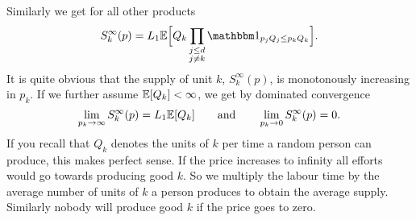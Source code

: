 Similarly we get for all other products
\[
	S_k^\infty(p)
	= L_1 \E\Bigl[
		Q_k \prod_{\substack{j\le\dims\\j\neq k}}\ind_{p_jQ_j\le p_k Q_k}
	\Bigr].
\]
It is quite obvious that the supply of unit \(k\), \(S^\infty_k(p)\), is
monotonously increasing in \(p_k\).  If we further assume \(\mathbb{E}[Q_k]<\infty\), we
get by dominated convergence
\[
	\lim_{p_k\to \infty}S_k^\infty(p) = L_1\mathbb{E}[Q_k]
	\qquad\text{and}\qquad
	\lim_{p_k\to 0}S_k^\infty(p) = 0.
\]
If you recall that \(Q_k\) denotes the units of \(k\) per time a random
person can produce, this makes perfect sense. If the price increases to infinity
all efforts would go towards producing good \(k\). So we multiply the labour
time by the average number of units of \(k\) a person produces to obtain the
average supply. Similarly nobody will produce good \(k\) if the price goes to
zero.
